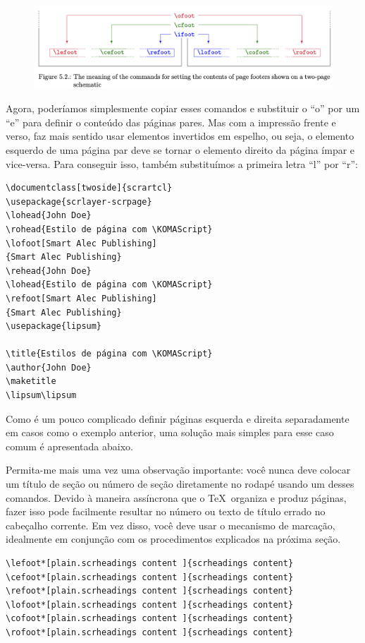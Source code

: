 \begin{figure}[h]
    \centering
    \includegraphics[width=1\linewidth]{imagem06.png}
\end{figure}

Agora, poderíamos simplesmente copiar esses comandos e substituir o “o” por um “e” para definir o conteúdo das páginas pares. Mas com a impressão frente e verso, faz mais sentido usar elementos invertidos em espelho, ou seja, o elemento esquerdo de uma página par deve se tornar o elemento direito da página ímpar e vice-versa. Para conseguir isso, também substituímos a primeira letra “l” por “r”:
\begin{verbatim}
\documentclass[twoside]{scrartcl}
\usepackage{scrlayer-scrpage}
\lohead{John Doe}
\rohead{Estilo de página com \KOMAScript}
\lofoot[Smart Alec Publishing]
{Smart Alec Publishing}
\rehead{John Doe}
\lohead{Estilo de página com \KOMAScript}
\refoot[Smart Alec Publishing]
{Smart Alec Publishing}
\usepackage{lipsum}

\title{Estilos de página com \KOMAScript}
\author{John Doe}
\maketitle
\lipsum\lipsum

\end{verbatim}

Como é um pouco complicado definir páginas esquerda e direita separadamente em casos como o exemplo anterior, uma solução mais simples para esse caso comum é apresentada abaixo.

Permita-me mais uma vez uma observação importante: você nunca deve colocar um título de seção ou número de seção diretamente no rodapé usando um desses comandos. Devido à maneira assíncrona que o \TeX\ organiza e produz páginas, fazer isso pode facilmente resultar no número ou texto de título errado no cabeçalho corrente. Em vez disso, você deve usar o mecanismo de marcação, idealmente em conjunção com os procedimentos explicados na próxima seção.
\begin{verbatim}
\lefoot*[plain.scrheadings content ]{scrheadings content}
\cefoot*[plain.scrheadings content ]{scrheadings content}
\refoot*[plain.scrheadings content ]{scrheadings content}
\lofoot*[plain.scrheadings content ]{scrheadings content}
\cofoot*[plain.scrheadings content ]{scrheadings content}
\rofoot*[plain.scrheadings content ]{scrheadings content}  
\end{verbatim}


